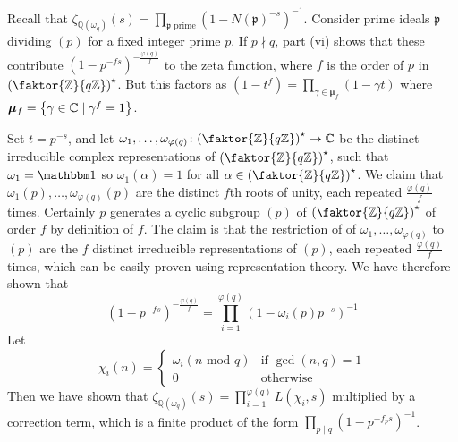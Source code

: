 Recall that \( \zeta_{\mathbb Q(\omega_q)}(s) = \prod_{\mathfrak p \text{ prime}} (1 - N(\mathfrak p)^{-s})^{-1} \).
Consider prime ideals \( \mathfrak p \) dividing \( (p) \) for a fixed integer prime \( p \).
If \( p \nmid q \), part (vi) shows that these contribute \( (1 - p^{-fs})^{-\frac{\varphi(q)}{f}} \) to the zeta function, where \( f \) is the order of \( p \) in \( \qty(\faktor{\mathbb Z}{q\mathbb Z})^\star \).
But this factors as \( (1 - t^f) = \prod_{\gamma \in \bm\mu_f}(1 - \gamma t) \) where \( \bm\mu_f = \qty{\gamma \in \mathbb C \mid \gamma^f = 1} \).

Set \( t = p^{-s} \), and let \( \omega_1, \dots, \omega_{\varphi(q)} \colon \qty(\faktor{\mathbb Z}{q\mathbb Z})^\star \to \mathbb C \) be the distinct irreducible complex representations of \( \qty(\faktor{\mathbb Z}{q\mathbb Z})^\star \), such that \( \omega_1 = \mathbbm 1 \) so \( \omega_1(\alpha) = 1 \) for all \( \alpha \in \qty(\faktor{\mathbb Z}{q\mathbb Z})^\star \).
We claim that \( \omega_1(p), \dots, \omega_{\varphi(q)}(p) \) are the distinct \( f \)th roots of unity, each repeated \( \frac{\varphi(q)}{f} \) times.
Certainly \( p \) generates a cyclic subgroup \( (p) \) of \( \qty(\faktor{\mathbb Z}{q\mathbb Z})^\star \) of order \( f \) by definition of \( f \).
The claim is that the restriction of of \( \omega_1, \dots, \omega_{\varphi(q)} \) to \( (p) \) are the \( f \) distinct irreducible representations of \( (p) \), each repeated \( \frac{\varphi(q)}{f} \) times, which can be easily proven using representation theory.
We have therefore shown that
\[ (1-p^{-fs})^{-\frac{\varphi(q)}{f}} = \prod_{i=1}^{\varphi(q)} (1 - \omega_i(p) p^{-s})^{-1} \]
Let
\[ \chi_i(n) = \begin{cases}
    \omega_i (n \text{ mod } q) & \text{if } \gcd(n,q) = 1 \\
    0 & \text{otherwise}
\end{cases} \]
Then we have shown that \( \zeta_{\mathbb Q(\omega_q)}(s) = \prod_{i=1}^{\varphi(q)} L(\chi_i, s) \) multiplied by a correction term, which is a finite product of the form \( \prod_{p \mid q} (1 - p^{-f_p s})^{-1} \).
